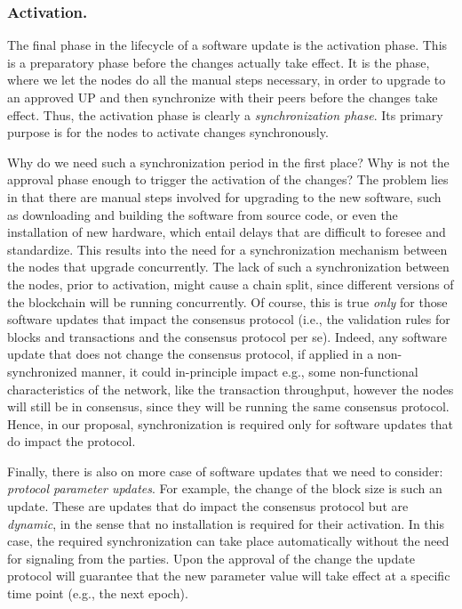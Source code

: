 \subsubsection{Activation.}\label{se:activation}

The final phase in the lifecycle of a software update is the activation phase. This is a preparatory phase before the changes actually take effect. It is the phase, where we let the nodes do all the manual steps necessary, in order to upgrade to an approved UP and then synchronize with their peers before the changes take effect.
 Thus, the activation phase is clearly a \emph{synchronization phase}. Its 
 primary purpose is for the nodes to activate changes synchronously.

Why do we need such a synchronization period in the first place? Why is not the 
approval phase enough to trigger the activation of the changes? The problem 
lies in that there are manual steps involved for upgrading to the new software, 
such as downloading and building the software from source code, or even the 
installation of new hardware, which entail delays that are difficult to foresee 
and standardize. This results into the need for a synchronization mechanism 
between the nodes that upgrade concurrently. The lack of such a synchronization 
between the nodes, prior to activation, might cause a chain split, since 
different versions of the blockchain will be running concurrently. Of course, 
this is true \emph{only} for those software updates that impact the consensus 
protocol (i.e., the validation rules for blocks and transactions and the 
consensus protocol per se). Indeed, any software update that does not change 
the consensus protocol, if applied in a non-synchronized manner, it could 
in-principle impact e.g., some non-functional characteristics of the network, 
like the transaction throughput, however the nodes will still be in consensus, 
since they will be running the same consensus protocol. Hence, in our proposal, 
synchronization is required only for software updates that do impact the 
protocol.

Finally, there is also on more case of software updates that we need to 
consider: \emph{protocol parameter updates}. For example, the change of the 
block size is such an update. These are updates that do impact the consensus 
protocol but are \emph{dynamic}, in the sense that no installation is required 
for their activation. In this case, the required synchronization can take place 
automatically without the need for signaling from the parties. Upon the 
approval of the change the update protocol will guarantee that the new 
parameter value will take effect at a specific time point (e.g., the next 
epoch).

